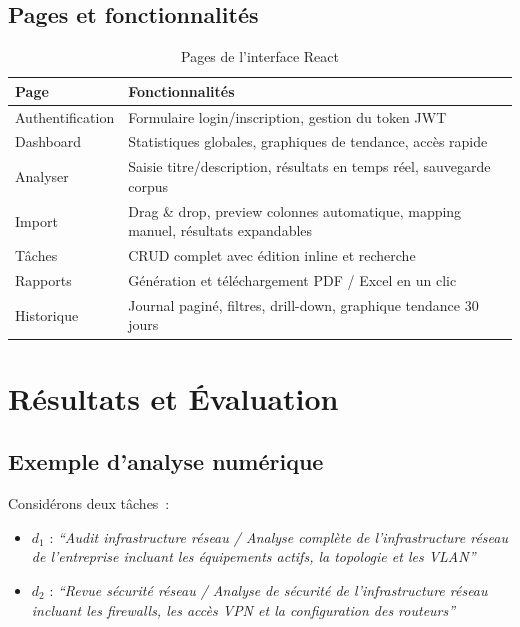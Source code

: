 \documentclass[12pt, a4paper]{article}
\begin{document}
\subsection{Pages et fonctionnalités}

\begin{table}[H]
\centering
\caption{Pages de l'interface React}
\begin{tabularx}{\textwidth}{lX}
\toprule
\rowcolor{tablehead}
\color{white}\textbf{Page} & \color{white}\textbf{Fonctionnalités} \\
\midrule
\rowcolor{tablegray}
Authentification & Formulaire login/inscription, gestion du token JWT \\
Dashboard        & Statistiques globales, graphiques de tendance, accès rapide \\
\rowcolor{tablegray}
Analyser         & Saisie titre/description, résultats en temps réel, sauvegarde corpus \\
Import           & Drag \& drop, preview colonnes automatique, mapping manuel, résultats expandables \\
\rowcolor{tablegray}
Tâches           & CRUD complet avec édition inline et recherche \\
Rapports         & Génération et téléchargement PDF / Excel en un clic \\
\rowcolor{tablegray}
Historique       & Journal paginé, filtres, drill-down, graphique tendance 30 jours \\
\bottomrule
\end{tabularx}
\end{table}

\section{Résultats et Évaluation}

\subsection{Exemple d'analyse numérique}

Considérons deux tâches~:

\begin{itemize}
  \item $d_1$ : \textit{``Audit infrastructure réseau / Analyse complète de l'infrastructure réseau de l'entreprise incluant les équipements actifs, la topologie et les VLAN''}
  \item $d_2$ : \textit{``Revue sécurité réseau / Analyse de sécurité de l'infrastructure réseau incluant les firewalls, les accès VPN et la configuration des routeurs''}
\end{itemize}
\end{document}
